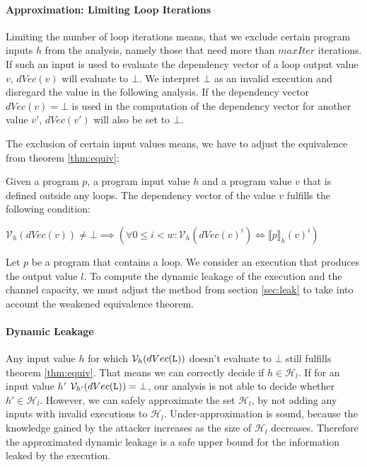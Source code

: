 \paragraph{Approximation: Limiting Loop Iterations}\label{sec:approx}
Limiting the number of loop iterations means, that we exclude certain program inputs $h$ from the analysis, namely those that need more than $maxIter$ iterations. If such an input is used to evaluate the dependency vector of a loop output value $v$, $dVec(v)$ will evaluate to $\bot$. We interpret $\bot$ as an invalid execution and disregard the value in the following analysis. If the dependency vector $dVec(v) = \bot$ is used in the computation of the dependency vector for another value $v'$, $dVec(v')$ will also be set to $\bot$.

The exclusion of certain input values means, we have to adjust the equivalence from theorem \ref{thm:equiv}:

\begin{theorem}\label{thm:weak}
    Given a program $p$, a program input value $h$ and a program value $v$ that is defined outside any loops. The dependency vector of the value $v$ fulfills the following condition:
    \begin{center}
        $\mathcal{V}_h(dVec(v)) \neq \bot \implies ( \forall 0 \leq i < w: \mathcal{V}_h(dVec(v)^i) \iff \llbracket p \rrbracket_h (v)^i)$
    \end{center}
\end{theorem}

Let $p$ be a program that contains a loop. We consider an execution that produces the output value $l$.
To compute the dynamic leakage of the execution and the channel capacity, we must adjust the method from section \ref{sec:leak} to take into account the weakened equivalence theorem.

\paragraph{Dynamic Leakage}
Any input value $h$ for which $\mathcal{V}_h(dVec(\mathtt{L}))$ doesn't evaluate to $\bot$ still fulfills theorem \ref{thm:equiv}. That means we can correctly decide if $h \in \mathcal{H}_l$. If for an input value $h'$ $\mathcal{V}_{h'}(dVec(\mathtt{L})) = \bot$, our analysis is not able to decide whether $h' \in \mathcal{H}_l$. However, we can safely approximate the set $\mathcal{H}_l$, by not adding any inputs with invalid executions to $\mathcal{H}_l$. Under-approximation is sound, because the knowledge gained by the attacker increases as the size of $\mathcal{H}_l$ decreases. Therefore the approximated dynamic leakage is a safe upper bound for the information leaked by the execution.

